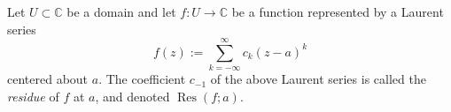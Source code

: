 \documentclass{article}
\begin{document}
Let $U \subset \mathbb{C}$ be a domain and let $f: U \longrightarrow \mathbb{C}$ be a function represented by a Laurent series
$$
f(z) := \sum_{k=-\infty}^\infty c_k (z-a)^k
$$
centered about $a$. The coefficient $c_{-1}$ of the above Laurent series is called the \emph{residue} of $f$ at $a$, and denoted $\operatorname{Res}(f;a)$.
\end{document}
